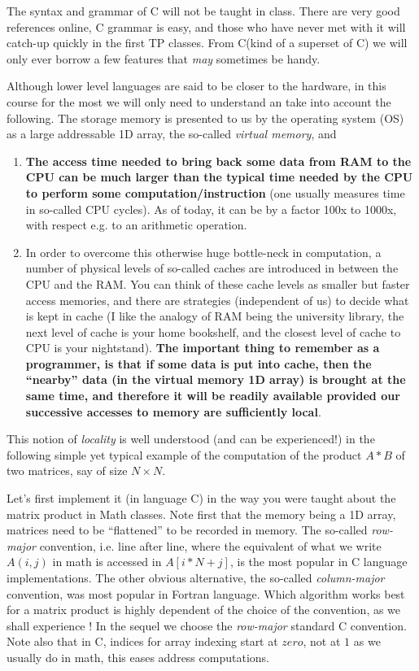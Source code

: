 \documentclass[12pt]{article}
\theoremstyle{plain}
\theoremstyle{remark}
\newcommand{\cpp}{C\nolinebreak\hspace{-.05em}\raisebox{.4ex}{\tiny\bf +}\nolinebreak\hspace{-.10em}\raisebox{.4ex}{\tiny\bf +}}
\begin{document}
The syntax and grammar of C will not be taught in class. There are very good
references online, C grammar is easy, and those who have never met with it 
will catch-up quickly in the first TP classes. From \cpp (kind of a superset of
C) we will only ever borrow a few features that {\it may} sometimes be handy.

\medskip

Although lower level languages are said to be closer to the hardware, in
this course for the most we will only need to understand an take into
account the following. The storage memory is presented to us by the 
operating system (OS) as a large addressable 1D array, the so-called 
{\it virtual memory}, and
\begin{enumerate}
\item 
{\bf The access time needed to bring back some data from RAM to the CPU can
be much larger than the typical time needed by the CPU to perform some
		computation/instruction} (one
usually measures time in so-called CPU cycles). As of today, it can be by a 
factor 100x to 1000x, with respect e.g. to an arithmetic operation.
\item
In order to overcome this otherwise huge bottle-neck in computation, a number of 
physical levels of so-called caches are introduced in between the CPU and the RAM. 
You can think of these cache levels as smaller but faster access memories, and
there are strategies (independent of us) to decide what is kept in cache (I
like the analogy of RAM being the university library, the next level of cache 
is your home bookshelf, and the closest level of cache to CPU is your
nightstand). {\bf The
important thing to remember as a programmer, is that if some data is put into cache,  
then the ``nearby'' data (in the virtual memory 1D array) is brought at the same time, 
and therefore it will be readily available provided our successive accesses to memory 
are sufficiently local}. 
\end{enumerate}

This notion of {\it locality} is well understood (and can be experienced!) in the following
simple yet typical example of the computation of the product $A * B$ of two
matrices, say of size $N \times N.$

\medskip

Let's first implement it (in language C) in the way you were taught about the matrix
product in Math classes. Note first that the memory being a 1D array, matrices need to
be ``flattened'' to be recorded in memory. The so-called {\it row-major} convention, 
i.e. line after line, where the equivalent of what we write $A(i,j)$ in math is
accessed in $A[i * N + j]$, is the most popular in C language implementations. 
The other obvious alternative, the so-called {\it column-major} convention, was 
most popular in Fortran language. Which algorithm works best for a matrix
product is highly dependent of the choice of the convention, as we shall
experience ! In the sequel we choose the {\it row-major} standard C
convention. Note also that in C, indices for array indexing start at $zero$,
not at $1$ as we usually do in math, this eases address computations.  
\end{document}
